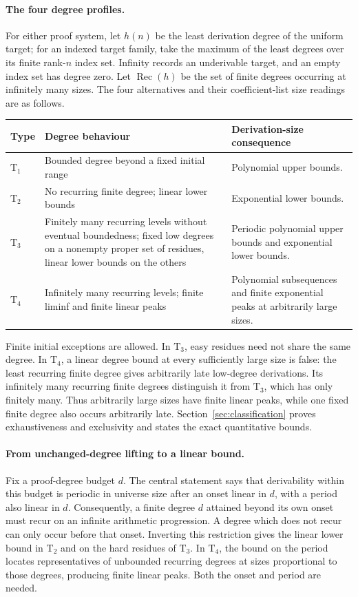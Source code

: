 \documentclass[11pt,a4paper]{article}
\theoremstyle{definition}\newtheorem{definition}[theorem]{Definition}
\theoremstyle{remark}\newtheorem{remark}[theorem]{Remark}
\DeclareMathOperator{\rec}{Rec}\DeclareMathOperator{\Soc}{Soc}\DeclareMathOperator{\Top}{Top}\DeclareMathOperator{\LIS}{LIS}
\begin{document}
\paragraph{The four degree profiles.}
For either proof system, let $h(n)$ be the least derivation degree of
the uniform target; for an indexed target family, take the maximum of
the least degrees over its finite rank-$n$ index set. Infinity records
an underivable target, and an empty index set has degree zero. Let
$\rec(h)$ be the set of finite degrees occurring at infinitely many
sizes. The four alternatives and their coefficient-list size readings
are as follows.
\begin{center}
\begin{tabular}{@{}p{}p{}p{}@{}}
\toprule
Type & Degree behaviour & Derivation-size consequence\\
\midrule
$\mathrm T_1$ & Bounded degree beyond a fixed initial range
 & Polynomial upper bounds.\\
$\mathrm T_2$ & No recurring finite degree; linear lower bounds
 & Exponential lower bounds.\\
$\mathrm T_3$ & Finitely many recurring levels without eventual boundedness;
fixed low degrees on a nonempty proper set of residues, linear lower
bounds on the others
 & Periodic polynomial upper bounds and exponential lower bounds.\\
$\mathrm T_4$ & Infinitely many recurring levels; finite liminf
and finite linear peaks
 & Polynomial subsequences and finite exponential peaks at arbitrarily
large sizes.\\
\bottomrule
\end{tabular}
\end{center}
Finite initial exceptions are allowed. In $\mathrm T_3$, easy residues
need not share the same degree. In $\mathrm T_4$, a linear degree bound
at every sufficiently large size is false: the least recurring finite
degree gives arbitrarily late low-degree derivations. Its infinitely many recurring finite degrees distinguish it from
$\mathrm T_3$, which has only finitely many. Thus arbitrarily large
sizes have finite linear peaks, while one fixed finite degree also
occurs arbitrarily late.
Section~\ref{sec:classification} proves exhaustiveness and exclusivity
and states the exact quantitative bounds.

\paragraph{From unchanged-degree lifting to a linear bound.}
Fix a proof-degree budget $d$. The central statement says that
derivability within this budget is periodic in universe size after
an onset linear in $d$, with a period also linear in $d$. Consequently,
a finite degree $d$ attained beyond its own onset must recur on an
infinite arithmetic progression. A degree which does not recur can
only occur before that onset. Inverting this restriction gives the
linear lower bound in $\mathrm T_2$ and on the hard residues of
$\mathrm T_3$. In $\mathrm T_4$, the bound on the period locates
representatives of unbounded recurring degrees at sizes proportional
to those degrees, producing finite linear peaks. Both the onset and
period are needed.
\end{document}
